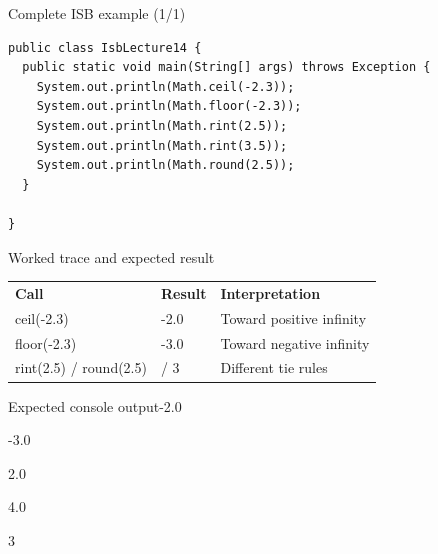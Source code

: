 \documentclass[10pt,aspectratio=169]{beamer}
\begin{document}
\begin{frame}[fragile,t]{Complete ISB example (1/1)}
\begin{lstlisting}
public class IsbLecture14 {
  public static void main(String[] args) throws Exception {
    System.out.println(Math.ceil(-2.3));
    System.out.println(Math.floor(-2.3));
    System.out.println(Math.rint(2.5));
    System.out.println(Math.rint(3.5));
    System.out.println(Math.round(2.5));
  }

}
\end{lstlisting}
\end{frame}

\begin{frame}[fragile,t]{Worked trace and expected result}
\small\renewcommand{\arraystretch}{1.4}
\begin{tabularx}{\textwidth}{>{\raggedright\arraybackslash}X>{\raggedright\arraybackslash}X>{\raggedright\arraybackslash}X}\rowcolor{navy}
\color{white}\bfseries Call & \color{white}\bfseries Result & \color{white}\bfseries Interpretation\\
ceil({-}2.3) & {-}2.0 & Toward positive infinity\\
floor({-}2.3) & {-}3.0 & Toward negative infinity\\
rint(2.5) / round(2.5) & 2.0 / 3 & Different tie rules\\
\end{tabularx}\par\vspace{2mm}
\begin{block}{Expected console output}\ttfamily\footnotesize {-}2.0\par {-}3.0\par 2.0\par 4.0\par 3\end{block}
\end{frame}
\end{document}
